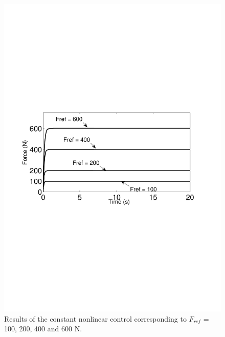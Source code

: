 \documentclass[10pt,twocolumn,letterpaper, 
]{article}
\begin{document}
\begin{figure}[ht!]
\centering
 \includegraphics[width=\columnwidth]{courbes100_600uconstant.pdf}
 \caption{Results of the constant nonlinear control corresponding to $F_{ref}$ = 100, 200, 400 and 600 N.}
\end{figure}
\end{document}
